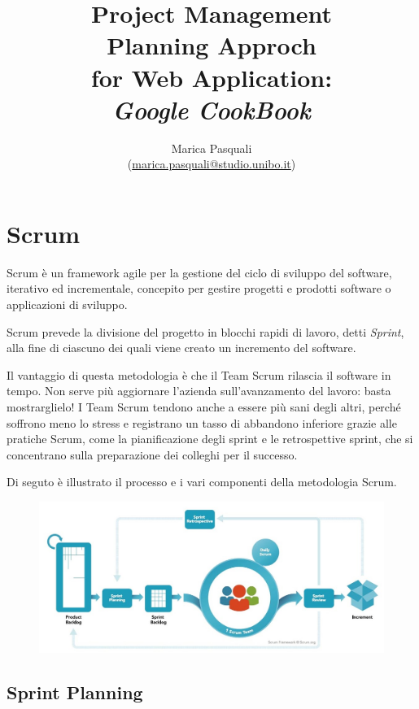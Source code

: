 \documentclass{article}
\title{
    Project Management \\
    \textbf{ 
        Planning Approch \\
        for Web Application: \\
        \textit{Google CookBook}
    }
}
\author{
    Marica Pasquali \\ 
    (\href{mailto:marica.pasquali@studio.unibo.it}{marica.pasquali@studio.unibo.it})
}
\begin{document}
\maketitle 
\newpage
\tableofcontents 
\newpage

\section{Scrum}

Scrum è un framework agile per la gestione del ciclo di sviluppo del software, iterativo ed incrementale, concepito 
per gestire progetti e prodotti software o applicazioni di sviluppo.

Scrum prevede la divisione del progetto in blocchi rapidi di lavoro, detti \textit{Sprint}, alla fine di ciascuno 
dei quali viene creato un incremento del software. 

Il vantaggio di questa metodologia è che il Team Scrum rilascia il software in tempo. 
Non serve più aggiornare l'azienda sull'avanzamento del lavoro: basta mostrarglielo! 
I Team Scrum tendono anche a essere più sani degli altri, perché soffrono meno lo stress e registrano 
un tasso di abbandono inferiore grazie alle pratiche Scrum, come la pianificazione degli sprint e le retrospettive 
sprint, che si concentrano sulla preparazione dei colleghi per il successo.


Di seguto è illustrato il processo e i vari componenti della metodologia Scrum.

\begin{figure}[h]
    \centering
    \includegraphics[width=\textwidth]{./imgs/scrum-process.jpg}
\end{figure}


\subsection{Sprint Planning}
\end{document}
